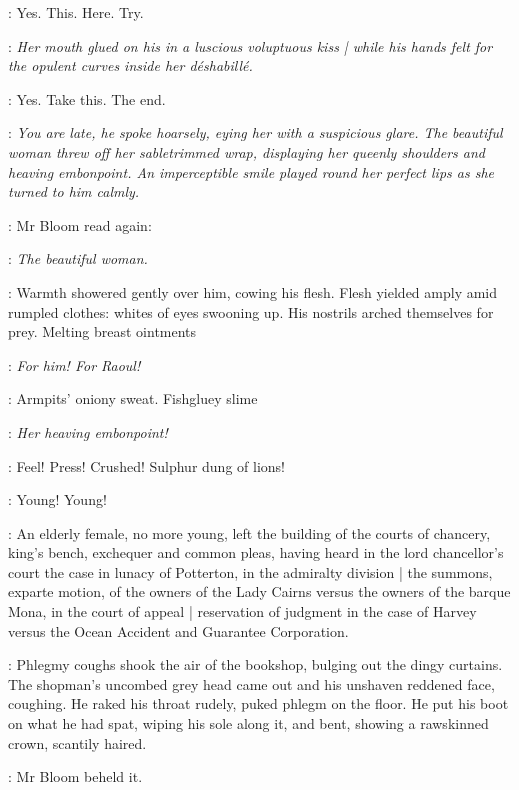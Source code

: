 \BloomInt:
Yes.
This.
Here.
Try.

\BloomInt:
\emph{Her mouth glued on his in a luscious voluptuous kiss |
while his hands felt for the opulent curves inside her déshabillé.}

\BloomInt:
Yes.
Take this.
The end.

\BloomInt:
\emph{You are late,
he spoke hoarsely,
eying her with a suspicious glare.
The beautiful woman threw off her sabletrimmed wrap,
displaying her queenly shoulders and heaving embonpoint.
An imperceptible smile played round her perfect lips
as she turned to him calmly.}

:
Mr Bloom read again:

\BloomInt:
\emph{The beautiful woman.}

\BloomInt:
Warmth showered gently over him,
cowing his flesh.
Flesh yielded amply amid rumpled clothes:
whites of eyes swooning up.
His nostrils arched themselves for prey.
Melting breast ointments

\BloomInt:
\emph{For him!
For Raoul!}

\BloomInt:
Armpits' oniony sweat.
Fishgluey slime

\BloomInt:
\emph{Her heaving embonpoint!}

\BloomInt:
Feel!
Press!
Crushed!
Sulphur dung of lions!

\BloomInt:
Young!
Young!

\begin{interject}
    :
    An elderly female,
    no more young,
    left the building of the courts of chancery,
    king's bench,
    exchequer
    and common pleas,
    having heard in the lord chancellor's court
    the case in lunacy of Potterton,
    in the admiralty division |
    the summons,
    exparte motion,
    of the owners of the Lady Cairns
    versus the owners of the barque Mona,
    in the court of appeal |
    reservation of judgment
    in the case of Harvey versus
    the Ocean Accident and Guarantee Corporation.
\end{interject}

:
Phlegmy coughs shook the air of the bookshop,
bulging out the dingy curtains.
The shopman's uncombed grey head came out
and his unshaven reddened face,
coughing.
He raked his throat rudely,
puked phlegm on the floor.
He put his boot on what he had spat,
wiping his sole along it,
and bent,
showing a rawskinned crown,
scantily haired.

:
Mr Bloom beheld it.

